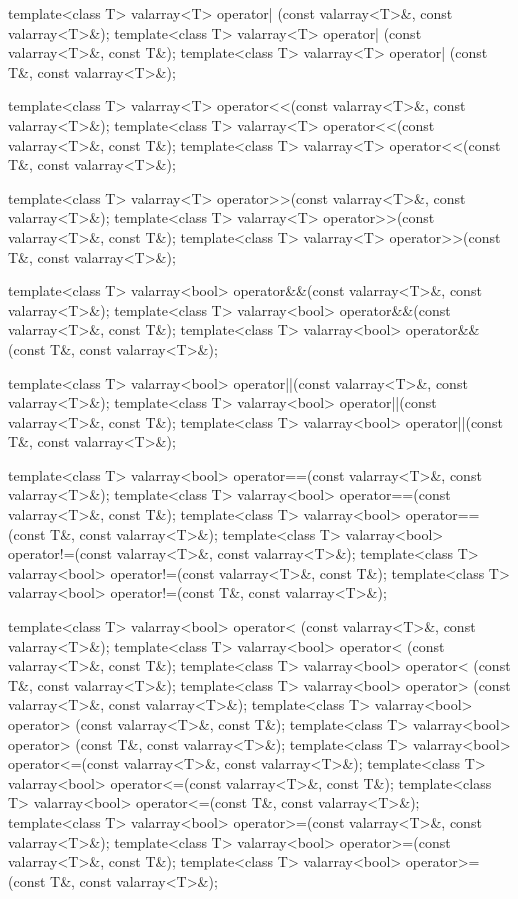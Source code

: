 \begin{codeblock}
{  template<class T> valarray<T> operator| (const valarray<T>&, const valarray<T>&);
  template<class T> valarray<T> operator| (const valarray<T>&, const T&);
  template<class T> valarray<T> operator| (const T&, const valarray<T>&);

  template<class T> valarray<T> operator<<(const valarray<T>&, const valarray<T>&);
  template<class T> valarray<T> operator<<(const valarray<T>&, const T&);
  template<class T> valarray<T> operator<<(const T&, const valarray<T>&);

  template<class T> valarray<T> operator>>(const valarray<T>&, const valarray<T>&);
  template<class T> valarray<T> operator>>(const valarray<T>&, const T&);
  template<class T> valarray<T> operator>>(const T&, const valarray<T>&);

  template<class T> valarray<bool> operator&&(const valarray<T>&, const valarray<T>&);
  template<class T> valarray<bool> operator&&(const valarray<T>&, const T&);
  template<class T> valarray<bool> operator&&(const T&, const valarray<T>&);

  template<class T> valarray<bool> operator||(const valarray<T>&, const valarray<T>&);
  template<class T> valarray<bool> operator||(const valarray<T>&, const T&);
  template<class T> valarray<bool> operator||(const T&, const valarray<T>&);

  template<class T>
    valarray<bool> operator==(const valarray<T>&, const valarray<T>&);
  template<class T> valarray<bool> operator==(const valarray<T>&, const T&);
  template<class T> valarray<bool> operator==(const T&, const valarray<T>&);
  template<class T>
    valarray<bool> operator!=(const valarray<T>&, const valarray<T>&);
  template<class T> valarray<bool> operator!=(const valarray<T>&, const T&);
  template<class T> valarray<bool> operator!=(const T&, const valarray<T>&);

  template<class T>
    valarray<bool> operator< (const valarray<T>&, const valarray<T>&);
  template<class T> valarray<bool> operator< (const valarray<T>&, const T&);
  template<class T> valarray<bool> operator< (const T&, const valarray<T>&);
  template<class T>
    valarray<bool> operator> (const valarray<T>&, const valarray<T>&);
  template<class T> valarray<bool> operator> (const valarray<T>&, const T&);
  template<class T> valarray<bool> operator> (const T&, const valarray<T>&);
  template<class T>
    valarray<bool> operator<=(const valarray<T>&, const valarray<T>&);
  template<class T> valarray<bool> operator<=(const valarray<T>&, const T&);
  template<class T> valarray<bool> operator<=(const T&, const valarray<T>&);
  template<class T>
    valarray<bool> operator>=(const valarray<T>&, const valarray<T>&);
  template<class T> valarray<bool> operator>=(const valarray<T>&, const T&);
  template<class T> valarray<bool> operator>=(const T&, const valarray<T>&);

}
\end{codeblock}
